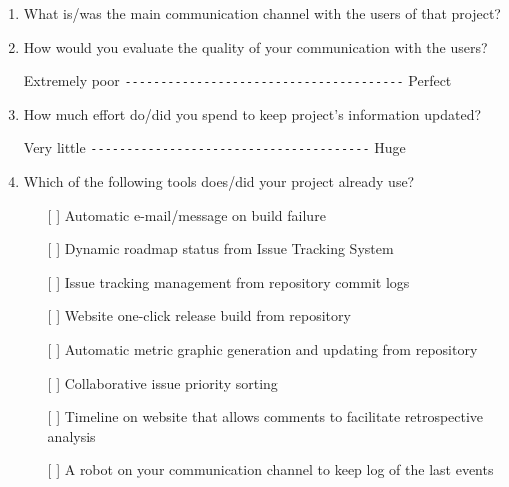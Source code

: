 \documentclass[lnbip]{svmultln}
\begin{document}
\begin{small}
\begin{enumerate}
  \item What is/was the main communication channel with the users of
    that project?
    \vspace{8pt}

  \item How would you evaluate the quality of your communication with
    the users?

    Extremely poor \verb=---------------------------------------=
    Perfect \vspace{8pt}

  \item How much effort do/did you spend to keep project's information
    updated?

    Very little \verb=---------------------------------------= Huge
    \vspace{8pt}

  \item Which of the following tools does/did your project already
    use?
    \begin{itemize}
    \item[[ ] ] Automatic e-mail/message on build failure
    \item[[ ] ] Dynamic roadmap status from Issue Tracking System
    \item[[ ] ] Issue tracking management from repository commit logs
    \item[[ ] ] Website one-click release build from repository
    \item[[ ] ] Automatic metric graphic generation and updating from
      repository
    \item[[ ] ] Collaborative issue priority sorting
    \item[[ ] ] Timeline on website that allows comments to facilitate
      retrospective analysis
    \item[[ ] ] A robot on your communication channel to keep log of
      the last events
    \end{itemize}
    \vspace{8pt}


\end{enumerate}
\end{small}
\end{document}
